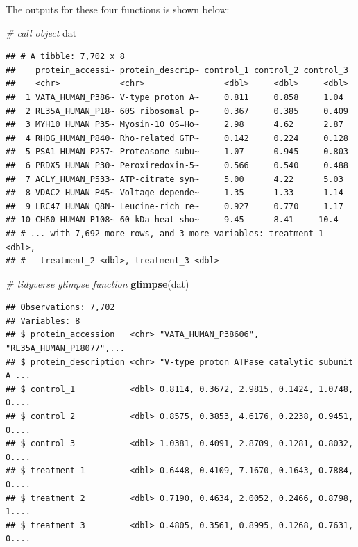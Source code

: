 \documentclass[12pt,]{book}
\newenvironment{Shaded}{\begin{snugshade}}{\end{snugshade}}
\newcommand{\CommentTok}[1]{\textcolor[rgb]{0.56,0.35,0.01}{\textit{#1}}}
\newcommand{\KeywordTok}[1]{\textcolor[rgb]{0.13,0.29,0.53}{\textbf{#1}}}
\newcommand{\NormalTok}[1]{#1}
\begin{document}
The outputs for these four functions is shown below:

\begin{Shaded}
\begin{Highlighting}[]
\CommentTok{# call object}
\NormalTok{dat}
\end{Highlighting}
\end{Shaded}

\begin{verbatim}
## # A tibble: 7,702 x 8
##    protein_accessi~ protein_descrip~ control_1 control_2 control_3
##    <chr>            <chr>                <dbl>     <dbl>     <dbl>
##  1 VATA_HUMAN_P386~ V-type proton A~     0.811     0.858     1.04 
##  2 RL35A_HUMAN_P18~ 60S ribosomal p~     0.367     0.385     0.409
##  3 MYH10_HUMAN_P35~ Myosin-10 OS=Ho~     2.98      4.62      2.87 
##  4 RHOG_HUMAN_P840~ Rho-related GTP~     0.142     0.224     0.128
##  5 PSA1_HUMAN_P257~ Proteasome subu~     1.07      0.945     0.803
##  6 PRDX5_HUMAN_P30~ Peroxiredoxin-5~     0.566     0.540     0.488
##  7 ACLY_HUMAN_P533~ ATP-citrate syn~     5.00      4.22      5.03 
##  8 VDAC2_HUMAN_P45~ Voltage-depende~     1.35      1.33      1.14 
##  9 LRC47_HUMAN_Q8N~ Leucine-rich re~     0.927     0.770     1.17 
## 10 CH60_HUMAN_P108~ 60 kDa heat sho~     9.45      8.41     10.4  
## # ... with 7,692 more rows, and 3 more variables: treatment_1 <dbl>,
## #   treatment_2 <dbl>, treatment_3 <dbl>
\end{verbatim}

\begin{Shaded}
\begin{Highlighting}[]
\CommentTok{# tidyverse glimpse function}
\KeywordTok{glimpse}\NormalTok{(dat)}
\end{Highlighting}
\end{Shaded}

\begin{verbatim}
## Observations: 7,702
## Variables: 8
## $ protein_accession   <chr> "VATA_HUMAN_P38606", "RL35A_HUMAN_P18077",...
## $ protein_description <chr> "V-type proton ATPase catalytic subunit A ...
## $ control_1           <dbl> 0.8114, 0.3672, 2.9815, 0.1424, 1.0748, 0....
## $ control_2           <dbl> 0.8575, 0.3853, 4.6176, 0.2238, 0.9451, 0....
## $ control_3           <dbl> 1.0381, 0.4091, 2.8709, 0.1281, 0.8032, 0....
## $ treatment_1         <dbl> 0.6448, 0.4109, 7.1670, 0.1643, 0.7884, 0....
## $ treatment_2         <dbl> 0.7190, 0.4634, 2.0052, 0.2466, 0.8798, 1....
## $ treatment_3         <dbl> 0.4805, 0.3561, 0.8995, 0.1268, 0.7631, 0....
\end{verbatim}
\end{document}
